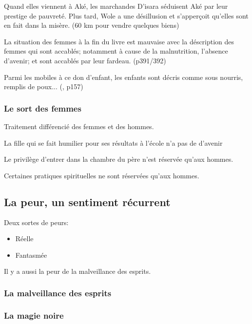 \documentclass[a4paper, 11pt, hidelinks]{article}
\newcommand{\bs}{\bigskip}
\newcommand{\rb}[1]{\Romanbar{#1}}
\begin{document}
Quand elles viennent à Aké, les marchandes D'isara séduisent Aké par leur prestige de pauvreté.
Plus tard, Wole a une désillusion et s'apperçoit qu'elles sont en fait dans la misère. (60 km pour vendre quelques biens)

\bs

La situation des femmes à la fin du livre est mauvaise avec la déscription des femmes qui sont accablés;
notamment à cause de la malnutrition, l'absence d'avenir; et sont accablés par leur fardeau. (p391/392)
\bs


Parmi les mobiles à ce don d'enfant, les enfants sont décris comme sous nourris, remplis de poux... (\rb{6}, p157)


\subsubsection{Le sort des  femmes}


Traitement différencié des femmes et des hommes.

\bs

La fille qui se fait humilier pour ses résultats à l'école n'a pas de d'avenir

\bs

Le privilège d'entrer dans la chambre du père n'est réservée qu'aux hommes.
\bs


Certaines pratiques spirituelles ne sont réservées qu'aux hommes.




\subsection{La peur, un sentiment récurrent}


Deux sortes de peurs:


\begin{itemize}
    \item Réelle
    \item Fantasmée
\end{itemize}


Il y a aussi la peur de la malveillance des esprits.


\subsubsection{La malveillance des esprits}




\subsubsection{La magie noire}
\end{document}

